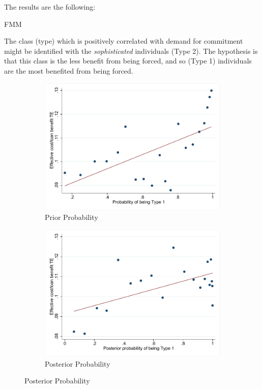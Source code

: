 \documentclass[oneside,11pt]{article}
\begin{document}
The results are the following:

\begin{table}[H]
\caption{FMM}
\label{iv_pf}
\begin{center}
\scriptsize{}
\end{center}
 \scriptsize

\end{table}



The class (type) which is positively correlated with demand for commitment might be identified with the \emph{sophisticated} individuals (Type 2). The hypothesis is that this class is the less benefit from being forced, and so (Type 1) individuals are the most benefited from being forced.

\begin{figure}[H]
    \caption{Probability of being Type 1 vs HTE}
    \label{}
    \begin{center}
    \begin{subfigure}{0.475\textwidth}
        \caption{Prior Probability}
        \centering
        \includegraphics[width=\textwidth]{Figuras/binscatter_tau_classpr.pdf}
    \end{subfigure}
    \begin{subfigure}{0.475\textwidth}
        \caption{Posterior Probability}
        \centering
        \includegraphics[width=\textwidth]{Figuras/binscatter_tau_classpost.pdf}

\end{subfigure}
\end{center}
\end{figure}
\end{document}
